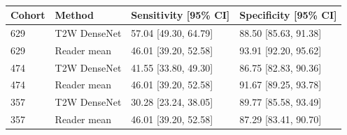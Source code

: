 \begin{table}[ht]
\centering
\caption{}
\label{tab:zw-reader-ci}
{\color{ZhixiangPink}\small
\begin{tabular}{llll}
\toprule
Cohort & Method & Sensitivity [95\% CI] & Specificity [95\% CI]\\
\midrule
629 & T2W DenseNet & 57.04 [49.30, 64.79] & 88.50 [85.63, 91.38]\\
629 & Reader mean & 46.01 [39.20, 52.58] & 93.91 [92.20, 95.62]\\
474 & T2W DenseNet & 41.55 [33.80, 49.30] & 86.75 [82.83, 90.36]\\
474 & Reader mean & 46.01 [39.20, 52.58] & 91.67 [89.25, 93.78]\\
357 & T2W DenseNet & 30.28 [23.24, 38.05] & 89.77 [85.58, 93.49]\\
357 & Reader mean & 46.01 [39.20, 52.58] & 87.29 [83.41, 90.70]\\
\bottomrule
\end{tabular}}
\end{table}
